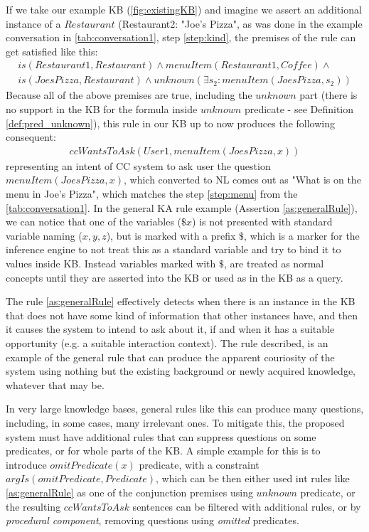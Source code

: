 If we take our example KB (\autoref{fig:existingKB}) and imagine we assert
an additional instance of a $Restaurant$ (Restaurant2: "Joe’s Pizza", as was 
done in the example conversation in \autoref{tab:conversation1}, 
step \ref{step:kind}, the premises of the rule can get satisfied like this:
\begin{equation}\label{as:generalRuleantecedent}
\begin{gathered}
is(Restaurant1,Restaurant) \land menuItem(Restaurant1,Coffee)\land \\
	is(JoesPizza,Restaurant) \land unknown(\exists s_2:menuItem(JoesPizza,s_2))
\end{gathered}
\end{equation}
Because all of the above premises are true, including the $unknown$ part
(there is no support in the KB for the formula inside $unknown$ predicate - see 
Definition \autoref{def:pred_unknown}), this rule in our KB up to now produces the 
following consequent:
\begin{equation}\label{as:generalRuleConsequent}
\begin{gathered}
	ccWantsToAsk(User1,menuItem(JoesPizza,x))
\end{gathered}
\end{equation}
representing an intent of CC system to ask user the question 
$menuItem(JoesPizza,x)$, which converted to NL comes out as "What is on the menu
in Joe's Pizza", which matches the step \ref{step:menu} from the 
\autoref{tab:conversation1}. In the general KA rule example (Assertion 
\ref{as:generalRule}), we can notice that one of the variables ($\$x$) is not 
presented with standard variable naming ($x,y,z$), but is marked with a prefix 
$\$$, which is a marker for the inference engine to not treat this as a standard
variable and try to bind it to values inside KB. Instead variables marked with
$\$$, are treated as normal concepts until they are asserted into the KB or used
as in the KB as a query. 

The rule \ref{as:generalRule} effectively detects when there is an instance in 
the KB that does not have some kind of information that other instances have, and
then it causes the system to intend to ask about it, if and when it has a 
suitable opportunity (e.g. a suitable interaction context). The rule described,
is an example of the general rule that can produce the apparent couriosity of 
the system using nothing but the existing background or newly acquired 
knowledge, whatever that may be.

In very large knowledge bases, general rules like this can produce many 
questions, including, in some cases, many irrelevant ones. To mitigate this, the
proposed system must have additional rules that can suppress questions on some 
predicates, or for whole parts of the KB. A simple example for this is to 
introduce $omitPredicate(x)$ predicate, with a constraint 
$argIs(omitPredicate,Predicate)$, which can be then either used int rules like
\ref{as:generalRule} as one of the conjunction premises using $unknown$
predicate, or the resulting $ccWantsToAsk$ sentences can be filtered with
additional rules, or by \emph{procedural component}, removing questions
using \emph{omitted} predicates.

